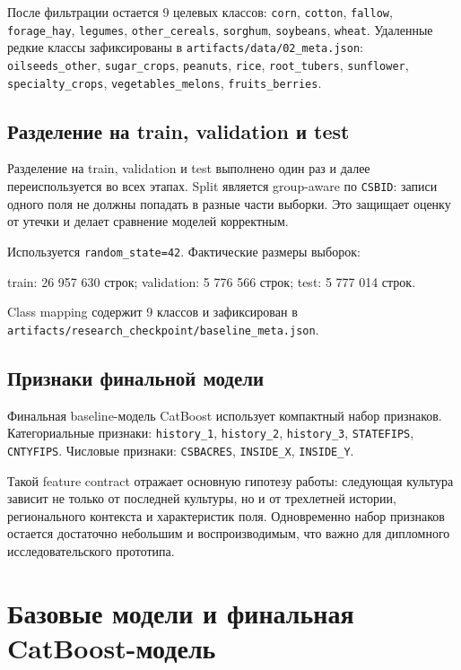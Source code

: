 \documentclass[a4paper,article,14pt]{extarticle}
\begin{document}
После фильтрации остается 9 целевых классов: \texttt{corn}, \texttt{cotton}, \texttt{fallow}, \texttt{forage\_hay}, \texttt{legumes}, \texttt{other\_cereals}, \texttt{sorghum}, \texttt{soybeans}, \texttt{wheat}. Удаленные редкие классы зафиксированы в \texttt{artifacts/data/02\_meta.json}: \texttt{oilseeds\_other}, \texttt{sugar\_crops}, \texttt{peanuts}, \texttt{rice}, \texttt{root\_tubers}, \texttt{sunflower}, \texttt{specialty\_crops}, \texttt{vegetables\_melons}, \texttt{fruits\_berries}.

\subsection{Разделение на train, validation и test}

Разделение на train, validation и test выполнено один раз и далее переиспользуется во всех этапах. Split является group-aware по \texttt{CSBID}: записи одного поля не должны попадать в разные части выборки. Это защищает оценку от утечки и делает сравнение моделей корректным.

Используется \texttt{random\_state=42}. Фактические размеры выборок:
\begin{itemize}
    \ITEM train: 26 957 630 строк;
    \ITEM validation: 5 776 566 строк;
    \ITEM test: 5 777 014 строк.
\end{itemize}
Class mapping содержит 9 классов и зафиксирован в \texttt{artifacts/research\_checkpoint/baseline\_meta.json}.

\subsection{Признаки финальной модели}

Финальная baseline-модель CatBoost использует компактный набор признаков. Категориальные признаки: \texttt{history\_1}, \texttt{history\_2}, \texttt{history\_3}, \texttt{STATEFIPS}, \texttt{CNTYFIPS}. Числовые признаки: \texttt{CSBACRES}, \texttt{INSIDE\_X}, \texttt{INSIDE\_Y}.

Такой feature contract отражает основную гипотезу работы: следующая культура зависит не только от последней культуры, но и от трехлетней истории, регионального контекста и характеристик поля. Одновременно набор признаков остается достаточно небольшим и воспроизводимым, что важно для дипломного исследовательского прототипа.

\section{Базовые модели и финальная CatBoost-модель}
\end{document}
